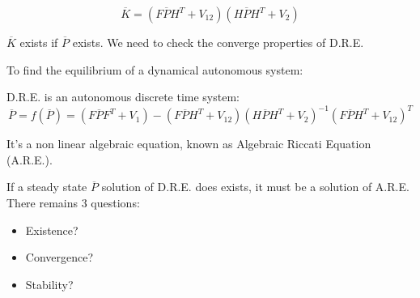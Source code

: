 \[
    \overline{K} = \left(F\overline{P}H^T + V_{12}\right)\left(H\overline{P}H^T+V_2\right)
\]

$\overline{K}$ exists if $\overline{P}$ exists.
We need to check the converge properties of D.R.E.

To find the equilibrium of a dynamical autonomous system:


D.R.E. is an autonomous discrete time system:
\[
    \overline{P} = f(\overline{P}) = \left( F\overline{P}F^T + V_1 \right)-\left(F\overline{P}H^T + V_{12}\right)\left(H\overline{P}H^T + V_2\right)^{-1}\left(F\overline{P}H^T+V_{12}\right)^T
\]

It's a non linear algebraic equation, known as Algebraic Riccati Equation (A.R.E.).

If a steady state $\overline{P}$ solution of D.R.E. does exists, it must be a solution of A.R.E.
There remains 3 questions:
\begin{itemize}
    \item Existence?
    \item Convergence?
    \item Stability?
\end{itemize}
